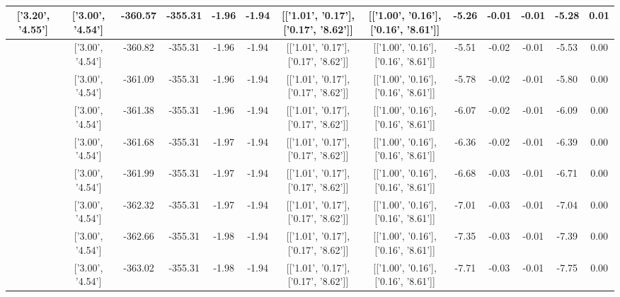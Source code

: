 \begin{table}[htbp]
\begin{adjustbox}{angle=90}
\begin{tabular}{|c|c|c|c|c|c|c|c|c|c|c|c|c|}
 ['3.20', '4.55'] & ['3.00', '4.54'] & -360.57 & -355.31 & -1.96 & -1.94 & [['1.01', '0.17'], ['0.17', '8.62']] & [['1.00', '0.16'], ['0.16', '8.61']] & -5.26 & -0.01 & -0.01 & -5.28 & 0.01\\ \hline
 ['3.21', '4.55'] & ['3.00', '4.54'] & -360.82 & -355.31 & -1.96 & -1.94 & [['1.01', '0.17'], ['0.17', '8.62']] & [['1.00', '0.16'], ['0.16', '8.61']] & -5.51 & -0.02 & -0.01 & -5.53 & 0.00\\ \hline
 ['3.22', '4.55'] & ['3.00', '4.54'] & -361.09 & -355.31 & -1.96 & -1.94 & [['1.01', '0.17'], ['0.17', '8.62']] & [['1.00', '0.16'], ['0.16', '8.61']] & -5.78 & -0.02 & -0.01 & -5.80 & 0.00\\ \hline
 ['3.23', '4.55'] & ['3.00', '4.54'] & -361.38 & -355.31 & -1.96 & -1.94 & [['1.01', '0.17'], ['0.17', '8.62']] & [['1.00', '0.16'], ['0.16', '8.61']] & -6.07 & -0.02 & -0.01 & -6.09 & 0.00\\ \hline
 ['3.25', '4.55'] & ['3.00', '4.54'] & -361.68 & -355.31 & -1.97 & -1.94 & [['1.01', '0.17'], ['0.17', '8.62']] & [['1.00', '0.16'], ['0.16', '8.61']] & -6.36 & -0.02 & -0.01 & -6.39 & 0.00\\ \hline
 ['3.26', '4.56'] & ['3.00', '4.54'] & -361.99 & -355.31 & -1.97 & -1.94 & [['1.01', '0.17'], ['0.17', '8.62']] & [['1.00', '0.16'], ['0.16', '8.61']] & -6.68 & -0.03 & -0.01 & -6.71 & 0.00\\ \hline
 ['3.27', '4.56'] & ['3.00', '4.54'] & -362.32 & -355.31 & -1.97 & -1.94 & [['1.01', '0.17'], ['0.17', '8.62']] & [['1.00', '0.16'], ['0.16', '8.61']] & -7.01 & -0.03 & -0.01 & -7.04 & 0.00\\ \hline
 ['3.28', '4.56'] & ['3.00', '4.54'] & -362.66 & -355.31 & -1.98 & -1.94 & [['1.01', '0.17'], ['0.17', '8.62']] & [['1.00', '0.16'], ['0.16', '8.61']] & -7.35 & -0.03 & -0.01 & -7.39 & 0.00\\ \hline
 ['3.29', '4.56'] & ['3.00', '4.54'] & -363.02 & -355.31 & -1.98 & -1.94 & [['1.01', '0.17'], ['0.17', '8.62']] & [['1.00', '0.16'], ['0.16', '8.61']] & -7.71 & -0.03 & -0.01 & -7.75 & 0.00\\ \hline
            \end{tabular}
        \end{adjustbox}
        \caption{}
        \label{}
    \end{table}
    
